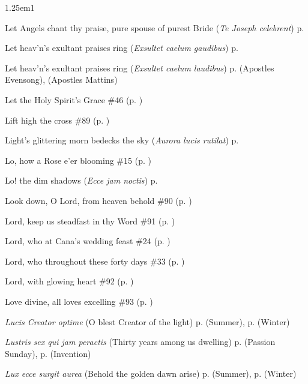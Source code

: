 \begin{hangparas}{1.25em}{1}
\par\noindent
Let Angels chant thy praise, pure spouse of purest Bride (\textit{Te Joseph celebrent}) \dotfill p. \pageref{PatronageEvensong}
\par\noindent
Let heav'n's exultant praises ring (\textit{Exsultet caelum gaudibus}) \dotfill p. \pageref{JohnMattinsHymn}
\par\noindent
Let heav'n's exultant praises ring (\textit{Exsultet caelum laudibus}) \dotfill p. \pageref{ApostlesEvensong} (Apostles Evensong), \pageref{ApostlesMattins} (Apostles Mattins)
\par\noindent
Let the Holy Spirit's Grace \dotfill \#46 (p. \pageref{Hymn46})
\par\noindent
Lift high the cross \dotfill \#89 (p. \pageref{Hymn89})
\par\noindent
Light's glittering morn bedecks the sky (\textit{Aurora lucis rutilat}) \dotfill p. \pageref{EasterDayMattins}
\par\noindent
Lo, how a Rose e'er blooming \dotfill \#15 (p. \pageref{Hymn15})
\par\noindent
Lo! the dim shadows (\textit{Ecce jam noctis}) \dotfill p. \pageref{SundayMattinsSummer}
\par\noindent
Look down, O Lord, from heaven behold \dotfill \#90 (p. \pageref{Hymn90})
\par\noindent
Lord, keep us steadfast in thy Word \dotfill \#91 (p. \pageref{Hymn91})
\par\noindent
Lord, who at Cana's wedding feast \dotfill \#24 (p. \pageref{Hymn24})
\par\noindent
Lord, who throughout these forty days \dotfill \#33 (p. \pageref{Hymn33})
\par\noindent
Lord, with glowing heart \dotfill \#92 (p. \pageref{Hymn92})
\par\noindent
Love divine, all loves excelling \dotfill \#93 (p. \pageref{Hymn93})
\par\noindent
\textit{Lucis Creator optime} (O blest Creator of the light) \dotfill p. \pageref{SundayEvensongSummer} (Summer), p. \pageref{SundayEvensongWinter} (Winter)
\par\noindent
\textit{Lustris sex qui jam peractis} (Thirty years among us dwelling) \dotfill p. \pageref{PassionMattinsHymn} (Passion Sunday), p. \pageref{InventionMattins} (Invention)
\par\noindent
\textit{Lux ecce surgit aurea} (Behold the golden dawn arise) \dotfill p. \pageref{ThursdayMattinsSummer} (Summer), p. \pageref{ThursdayMattinsWinter} (Winter)

\end{hangparas}
